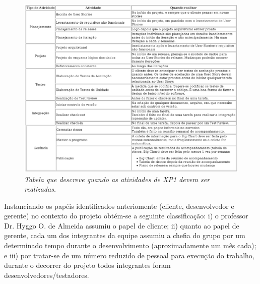 \begin{figure}[!h]
 \flushleft
 \includegraphics[scale=0.38]{tab1.eps}
 \caption{\it Tabela que descreve quando as atividades de XP1 devem ser realizadas.} \label{tab:tab1}
\end{figure}


Instanciando os papéis identificados anteriomente (cliente, desenvolvedor e gerente) no contexto do projeto obtém-se a seguinte classificação: i) o professor Dr. Hyggo O. de Almeida assumiu o papel de cliente; ii) quanto ao papel de gerente, cada um dos integrantes da equipe assumiu a chefia do grupo por um determinado tempo durante o desenvolvimento (aproximadamente um mês cada); e iii) por tratar-se de um número reduzido de pessoal para execução do trabalho, durante o decorrer do projeto todos integrantes foram desenvolvedores/testadores.

